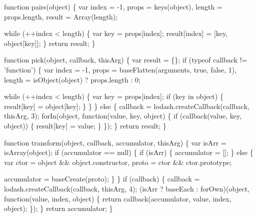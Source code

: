\begin{DoxyCodeInclude}
    \textcolor{keyword}{function} pairs(\textcolor{keywordtype}{object}) \{
      var index = -1,
          props = keys(\textcolor{keywordtype}{object}),
          length = props.length,
          result = Array(length);

      \textcolor{keywordflow}{while} (++index < length) \{
        var key = props[index];
        result[index] = [key, \textcolor{keywordtype}{object}[key]];
      \}
      \textcolor{keywordflow}{return} result;
    \}

    \textcolor{keyword}{function} pick(\textcolor{keywordtype}{object}, callback, thisArg) \{
      var result = \{\};
      \textcolor{keywordflow}{if} (typeof callback != \textcolor{stringliteral}{'function'}) \{
        var index = -1,
            props = baseFlatten(arguments, \textcolor{keyword}{true}, \textcolor{keyword}{false}, 1),
            length = isObject(\textcolor{keywordtype}{object}) ? props.length : 0;

        \textcolor{keywordflow}{while} (++index < length) \{
          var key = props[index];
          \textcolor{keywordflow}{if} (key in \textcolor{keywordtype}{object}) \{
            result[key] = \textcolor{keywordtype}{object}[key];
          \}
        \}
      \} \textcolor{keywordflow}{else} \{
        callback = lodash.createCallback(callback, thisArg, 3);
        forIn(\textcolor{keywordtype}{object}, \textcolor{keyword}{function}(value, key, \textcolor{keywordtype}{object}) \{
          \textcolor{keywordflow}{if} (callback(value, key, \textcolor{keywordtype}{object})) \{
            result[key] = value;
          \}
        \});
      \}
      \textcolor{keywordflow}{return} result;
    \}

    \textcolor{keyword}{function} transform(\textcolor{keywordtype}{object}, callback, accumulator, thisArg) \{
      var isArr = isArray(\textcolor{keywordtype}{object});
      \textcolor{keywordflow}{if} (accumulator == null) \{
        \textcolor{keywordflow}{if} (isArr) \{
          accumulator = [];
        \} \textcolor{keywordflow}{else} \{
          var ctor = \textcolor{keywordtype}{object} && \textcolor{keywordtype}{object}.constructor,
              proto = ctor && ctor.prototype;

          accumulator = baseCreate(proto);
        \}
      \}
      \textcolor{keywordflow}{if} (callback) \{
        callback = lodash.createCallback(callback, thisArg, 4);
        (isArr ? baseEach : forOwn)(\textcolor{keywordtype}{object}, \textcolor{keyword}{function}(value, index, \textcolor{keywordtype}{object}) \{
          \textcolor{keywordflow}{return} callback(accumulator, value, index, \textcolor{keywordtype}{object});
        \});
      \}
      \textcolor{keywordflow}{return} accumulator;
    \}


\end{DoxyCodeInclude}

